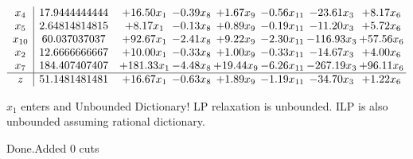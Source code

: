 \documentclass[8pt]{article}
\begin{document}
 \[\begin{array}{c| c c@{\hskip 2pt} c@{\hskip 2pt} c@{\hskip 2pt} c@{\hskip 2pt} c@{\hskip 2pt} c@{\hskip 2pt} }
 x_{4}   &  17.9444444444 & + 16.50 x_{1} & -0.39 x_{8} & +  1.67 x_{9} & -0.56 x_{11} & -23.61 x_{3} & +  8.17 x_{6}\\
 x_{5}   &  2.64814814815 & +  8.17 x_{1} & -0.13 x_{8} & +  0.89 x_{9} & -0.19 x_{11} & -11.20 x_{3} & +  5.72 x_{6}\\
 x_{10}   &  60.037037037 & + 92.67 x_{1} & -2.41 x_{8} & +  9.22 x_{9} & -2.30 x_{11} & -116.93 x_{3} & + 57.56 x_{6}\\
 x_{2}   &  12.6666666667 & + 10.00 x_{1} & -0.33 x_{8} & +  1.00 x_{9} & -0.33 x_{11} & -14.67 x_{3} & +  4.00 x_{6}\\
 x_{7}   &  184.407407407 & + 181.33 x_{1} & -4.48 x_{8} & + 19.44 x_{9} & -6.26 x_{11} & -267.19 x_{3} & + 96.11 x_{6}\\
\hline
z    &  51.1481481481 & + 16.67 x_{1} & -0.63 x_{8} & +  1.89 x_{9} & -1.19 x_{11} & -34.70 x_{3} & +  1.22 x_{6}\\
\end{array}\]


 $ x_{1} $ enters and Unbounded Dictionary!
 LP relaxation is unbounded. ILP is also unbounded assuming rational dictionary. 

Done.Added 0 cuts 
\end{document}
